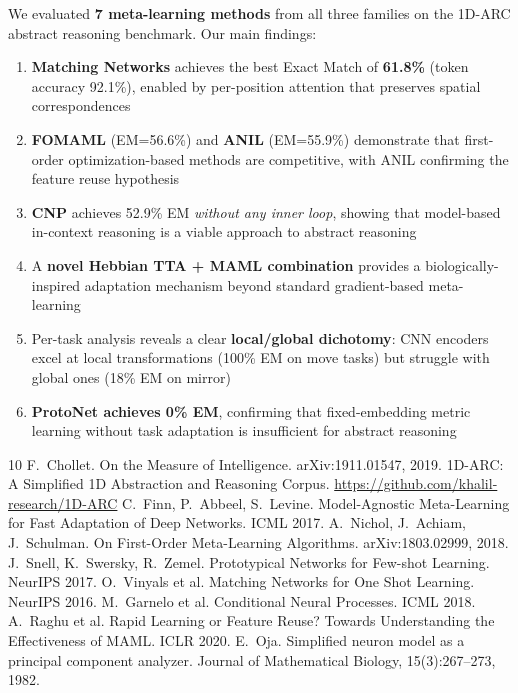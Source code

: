 \documentclass[11pt,a4paper]{article}
\begin{document}
We evaluated \textbf{7 meta-learning methods} from all three families on the 1D-ARC abstract reasoning benchmark. Our main findings:
\begin{enumerate}[nosep]
  \item \textbf{Matching Networks} achieves the best Exact Match of \textbf{61.8\%} (token accuracy 92.1\%), enabled by per-position attention that preserves spatial correspondences
  \item \textbf{FOMAML} (EM=56.6\%) and \textbf{ANIL} (EM=55.9\%) demonstrate that first-order optimization-based methods are competitive, with ANIL confirming the feature reuse hypothesis
  \item \textbf{CNP} achieves 52.9\% EM \emph{without any inner loop}, showing that model-based in-context reasoning is a viable approach to abstract reasoning
  \item A \textbf{novel Hebbian TTA + MAML combination} provides a biologically-inspired adaptation mechanism beyond standard gradient-based meta-learning
  \item Per-task analysis reveals a clear \textbf{local/global dichotomy}: CNN encoders excel at local transformations (100\% EM on move tasks) but struggle with global ones (18\% EM on mirror)
  \item \textbf{ProtoNet achieves 0\% EM}, confirming that fixed-embedding metric learning without task adaptation is insufficient for abstract reasoning
\end{enumerate}

\begin{thebibliography}{10}
 F.~Chollet. On the Measure of Intelligence. arXiv:1911.01547, 2019.
 1D-ARC: A Simplified 1D Abstraction and Reasoning Corpus. \url{https://github.com/khalil-research/1D-ARC}
 C.~Finn, P.~Abbeel, S.~Levine. Model-Agnostic Meta-Learning for Fast Adaptation of Deep Networks. ICML 2017.
 A.~Nichol, J.~Achiam, J.~Schulman. On First-Order Meta-Learning Algorithms. arXiv:1803.02999, 2018.
 J.~Snell, K.~Swersky, R.~Zemel. Prototypical Networks for Few-shot Learning. NeurIPS 2017.
 O.~Vinyals et al. Matching Networks for One Shot Learning. NeurIPS 2016.
 M.~Garnelo et al. Conditional Neural Processes. ICML 2018.
 A.~Raghu et al. Rapid Learning or Feature Reuse? Towards Understanding the Effectiveness of MAML. ICLR 2020.
 E.~Oja. Simplified neuron model as a principal component analyzer. Journal of Mathematical Biology, 15(3):267--273, 1982.
\end{thebibliography}
\end{document}
